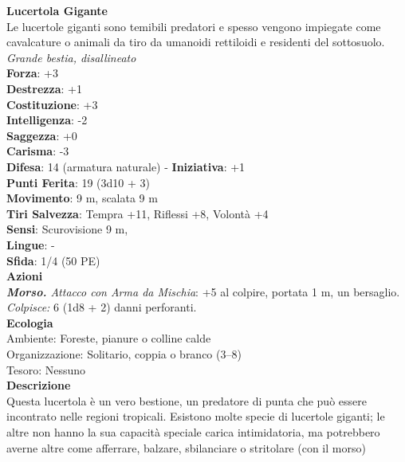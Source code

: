 \begin{multicols}{2}
\medskip\textbf{Lucertola Gigante}\\
Le lucertole giganti sono temibili predatori e spesso vengono impiegate come cavalcature o animali da tiro da umanoidi rettiloidi e residenti del sottosuolo.\\
\emph{Grande bestia, disallineato} \\
\textbf{Forza}: +3\\
\textbf{Destrezza}: +1\\
\textbf{Costituzione}: +3\\
\textbf{Intelligenza}: -2\\
\textbf{Saggezza}: +0\\
\textbf{Carisma}: -3\\
\textbf{Difesa}: 14 (armatura naturale) - \textbf{Iniziativa}: +1\\
\textbf{Punti Ferita}: 19 (3d10 + 3)\\
\textbf{Movimento}: 9 m, scalata 9 m\\
\textbf{Tiri Salvezza}: Tempra +11, Riflessi +8, Volontà +4 \\
\textbf{Sensi}: Scurovisione 9 m, \\
\textbf{Lingue}: -\\
\textbf{Sfida}: 1/4 (50 PE)\smallskip\\
\smallskip\textbf{Azioni}\\
\emph{\textbf{Morso.} Attacco con Arma da Mischia}: +5 al colpire, portata 1 m, un bersaglio.\\
\emph{Colpisce:} 6 (1d8 + 2) danni perforanti.\\
\textbf{Ecologia}\\
Ambiente: Foreste, pianure o colline calde\\
Organizzazione: Solitario, coppia o branco (3–8)\\
Tesoro: Nessuno\\
\textbf{Descrizione}\\

Questa lucertola è un vero bestione, un predatore di punta che può essere incontrato nelle regioni tropicali. Esistono molte specie di lucertole giganti; le altre non hanno la sua capacità speciale carica intimidatoria, ma potrebbero averne altre come afferrare, balzare, sbilanciare o stritolare (con il morso)\\


\end{multicols}
